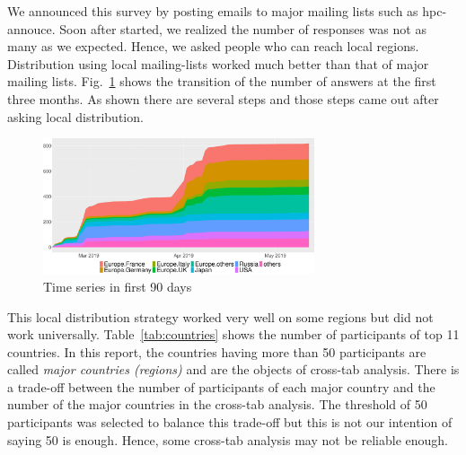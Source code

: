 \documentclass[conference,10pt,letterpaper]{IEEEtran}
\begin{document}
%
%
We announced this survey by posting emails to major mailing lists such
as hpc-annouce. Soon after started, we realized the number of
responses was not as many as we expected. Hence, we asked people who can
reach local regions. Distribution using local mailing-lists worked
much better than that of major mailing
lists. Fig.~\ref{fig:time-series} shows the transition of the number
of answers at the first three months. As shown there are several steps
and those steps came out after asking local distribution. 

\begin{figure}[htb]
  \begin{center}
    \includegraphics[width=8cm]{R-scripts/TimeSeries.pdf}
    \caption{Time series in first 90 days}
    \label{fig:time-series}
  \end{center}
\end{figure}

This local distribution strategy worked very well on some regions but
did not work universally. Table~\ref{tab:countries} shows the number
of participants of top 11 countries. In this report, the
countries having more than 50 participants are called {\it major
  countries (regions)} and are the objects of cross-tab
analysis. There is a trade-off between the number of participants of
each major country 
and the number of the major countries in the cross-tab analysis. The
threshold of 50 participants was selected to balance this trade-off
but this is not our intention of saying 50 is enough. Hence, some
cross-tab analysis may not be reliable enough.
\end{document}
